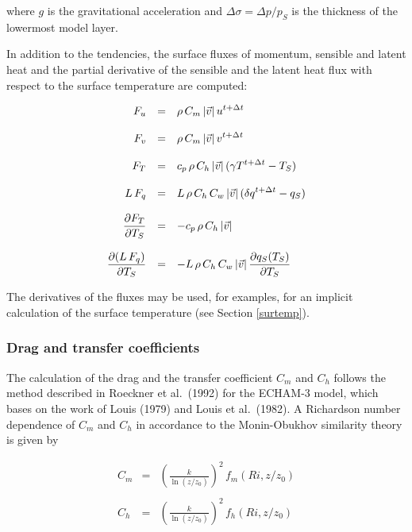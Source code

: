 where $g$  is the gravitational acceleration and $\Delta
\sigma = \Delta p/p_S $ is the thickness of the
lowermost model layer. 

In addition to the tendencies, the surface fluxes of
momentum, sensible and latent heat and the
partial derivative of the sensible and the latent heat flux 
with respect to the surface temperature
are computed:

\begin{equation}\label{fluxes2}
\begin{array}{rcl}
\displaystyle F_u   & = & \displaystyle \rho \, C_m \, |\vec{v}| \,
u^{t+\Delta t} \\
&& \\
\displaystyle F_v   & = & \displaystyle \rho \, C_m \, |\vec{v}| \, v^{t+
\Delta t}\\
&& \\
\displaystyle F_T   & = & \displaystyle c_p \, \rho \, C_h \, |\vec{v}|  \,
(\gamma
T^{t + \Delta t}
- T_S )  \\
&& \\
\displaystyle L \, F_q & = & \displaystyle L\, \rho \, C_h \, C_w \, |\vec{v}|
\, 
(\delta
q^{t+\Delta t} -  q_S ) \\
&& \\
\displaystyle \frac{\partial F_T}{\partial T_S}  & = & \displaystyle - c_p \,
\rho \, C_h \, |\vec{v}|  \\
&& \\
\displaystyle \frac{\partial (L \, F_q)}{\partial T_S} & = & \displaystyle -
L\, \rho \, C_h \, C_w \, |\vec{v}| \, 
\frac{\partial  q_S(T_S)}{\partial T_S}
\end{array}
\end{equation}

The derivatives of the fluxes may be used, for
examples, for an implicit calculation of the
surface temperature (see Section \ref{surtemp}). 

\subsubsection*{ Drag and transfer coefficients}

The calculation of  the drag and the transfer 
coefficient $C_m$ and $C_h$ follows the method 
described  in Roeckner et al.~(1992) for the ECHAM-3
model,  which bases on the work of Louis (1979) and
Louis et al.~(1982).  A Richardson number dependence
of 
$C_m$ and $C_h$  in accordance to the
Monin-Obukhov
similarity theory is given by

\begin{equation}
\begin{array}{rcl}
C_m & = & \left( \frac{k}{\ln (z/z_0)}\right)^{2} \,
f_m
(Ri, z/z_0) \\
&&\\
C_h & = & \left( \frac{k}{\ln (z/z_0)}\right)^{2} \, f_h
(Ri, z/z_0) 
\end{array}
\end{equation}


